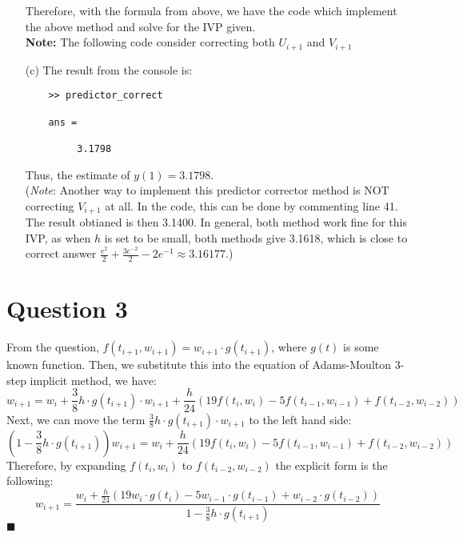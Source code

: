 \documentclass[11pt]{article}
\begin{document}
\begin{itemize}
	Therefore, with the formula from above, we have the code which implement the above method and solve for the IVP given.\\
	\textbf{Note:} The following code consider correcting both $ U_{i+1} $ and $ V_{i+1} $\\
	
	
	\item [(c)]
	The result from the console is:
	\begin{verbatim}
	>> predictor_correct
	
	ans =
	
	     3.1798
	\end{verbatim}
	Thus, the estimate of $ \boxed{y(1) = 3.1798} $.\\ (\textit{Note}: Another way to implement this predictor corrector method is NOT correcting $ V_{i+1} $ at all. In the code, this can be done by commenting line 41. The result obtianed is then 3.1400. In general, both method work fine for this IVP, as when $ h $ is set to be small, both methods give 3.1618, which is close to correct answer $ \displaystyle \frac{e^2}{2} + \frac{3e^{-2}}{2} - 2e^{-1} \approx 3.16177 $.)
	
\end{itemize}

\section*{Question 3}
From the question, $ f(t_{i+1},w_{i+1}) = w_{i+1}\cdot g(t_{i+1}) $, where $ g(t) $ is some known function. Then, we substitute this into the equation of Adams-Moulton 3-step implicit method, we have:
\[ w_{i+1} = w_i + \frac{3}{8}h\cdot g(t_{i+1}) \cdot w_{i+1} + \frac{h}{24}\left( 19f(t_i,w_i) - 5f(t_{i-1},w_{i-1}) + f(t_{i-2},w_{i-2}) \right) \]
Next, we can move the term $ \frac{3}{8}h\cdot g(t_{i+1})\cdot w_{i+1} $ to the left hand side:
\[ \left(1 - \frac{3}{8}h\cdot g(t_{i+1}) \right) w_{i+1} = w_i + \frac{h}{24}\left( 19f(t_i,w_i) - 5f(t_{i-1},w_{i-1}) + f(t_{i-2},w_{i-2}) \right) \]
Therefore, by expanding $ f(t_i,w_i) $ to $ f(t_{i-2},w_{i-2}) $ the explicit form is the following:
\[ \boxed{w_{i+1} = \frac{w_i + \frac{h}{24}(19w_i\cdot g(t_i)-5w_{i-1}\cdot g(t_{i-1})+w_{i-2}\cdot g(t_{i-2}))}{1-\frac{3}{8}h\cdot g(t_{i+1})}} \]
\hfill $ \blacksquare $
\end{document}

